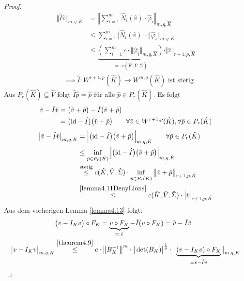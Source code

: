 \begin{proof}
\begin{align*}
\big\Vert \hat{I} \hat{v} \big\Vert_{m,q,\hat{K}} 
&=\left\Vert \sum\limits_{i=1}^m \hat{N}_i(\hat{v}) \cdot \hat{\varphi}_i \right\Vert_{m,q,\hat{K}} \\
&\leq \sum\limits_{i=1}^m \big| \hat{N}_i(\hat{v}) \big| \cdot \big\Vert \hat{\varphi}_i \big\Vert_{m,q,\hat{K}} \\
&\leq \underbrace{\left( \sum\limits_{i=1}^m c\cdot \big\Vert \hat{\varphi}_i \big\Vert_{m,q,\hat{K}}\right)}_{=:c(\hat{K},\hat{V},\hat{\Sigma})}\cdot\Vert\hat{v}\Vert_{r+1,p,\hat{K}}
\end{align*}
\begin{align*}
&\implies \hat{I}:W^{r+1,p}(\hat{K})\to W^{m,q}(\hat{K})\text{ ist stetig}
\end{align*}
Aus $P_r(\hat{K})\subseteq \hat{V}$ folgt $\hat{I}\hat{p}=\hat{p}$ für alle $\hat{p}\in P_r(\hat{K})$. Es folgt
\begin{align*}
\hat{v}-\hat{I}\hat{v}
&=\big(\hat{v}+\hat{p}\big)-\hat{I}\big(\hat{v}+\hat{p}\big) \\
&=\big(\text{id} -\hat{I}\big)\big(\hat{v}+\hat{p}\big) 
\qquad\forall \hat{v}\in W^{r+1,p}(\hat{K}),\forall \hat{p}\in P_r(\hat{K})
\end{align*}
\begin{align*}
\big| \hat{v}-\hat{I} \hat{v} \big|_{m,q,\hat{K}}
&=\Big| \big( \text{id} - \hat{I} \big) \big( \hat{v}+\hat{p} \big) \Big|_{m,q,\hat{K}} \qquad\forall\hat{p}\in P_r(\hat{K})\\
&\leq \inf\limits_{\hat{p}\in P_r(\hat{K})} \Big| \big(\text{id}-\hat{I}\big) \big(\hat{v}+\hat{p}\big) \Big|_{m,q,\hat{K}}\\
&\stackrel{\text{stetig}}{\leq} c(\hat{K},\hat{V},\hat{\Sigma})\cdot\inf\limits_{\hat{p}\in P_r(\hat{K})}\big\Vert\hat{v}+\hat{p}\big\Vert_{r+1,p,\hat{K}} \\
&\stackrel{\ref{lemma4.11DenyLions}}{\leq}
c(\hat{K},\hat{V},\hat{\Sigma})\cdot\big|\hat{v}\big|_{r+1,p,\hat{K}}
\end{align*}
Aus dem vorherigen Lemma \ref{lemma4.13} folgt:
\begin{align*}
&\big(v-I_K  v\big)\circ F_K=\underbrace{v\circ F_K}_{=:\hat{v}}-\hat{I}(v\circ F_K)=\hat{v}-\hat{I}\hat{v}\\
\big| v-I_K v\big|_{m,q,K} 
&\stackrel{\ref{theorem4.9}}{\leq}
c\cdot\big\Vert B_K^{-1}\big\Vert^m\cdot\big|\det(B_K)\big|^{\frac{1}{q}}\cdot\big|\underbrace{(v-I_K v)\circ F_K}_{=\hat{v}-\hat{I}\hat{v}}\big|_{m,q,K}\\

\end{align*}
\end{proof}
